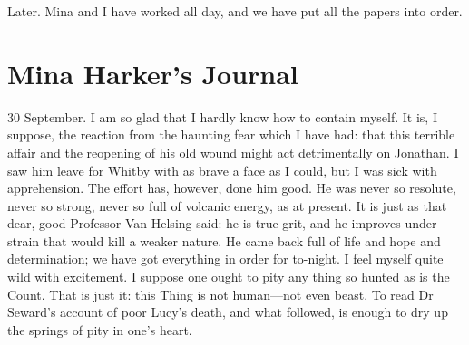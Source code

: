 \begin{diary}{Later.}
Mina and I have worked all day, and we have put all the papers into order.
\end{diary}

\section{Mina Harker's Journal}

\begin{diary}{30 September.}
I am so glad that I hardly know how to contain myself. It is, I suppose, the reaction from the haunting fear which I have had: that this terrible affair and the reopening of his old wound might act detrimentally on Jonathan. I saw him leave for Whitby with as brave a face as I could, but I was sick with apprehension. The effort has, however, done him good. He was never so resolute, never so strong, never so full of volcanic energy, as at present. It is just as that dear, good Professor Van Helsing said: he is true grit, and he improves under strain that would kill a weaker nature. He came back full of life and hope and determination; we have got everything in order for to-night. I feel myself quite wild with excitement. I suppose one ought to pity any thing so hunted as is the Count. That is just it: this Thing is not human—not even beast. To read Dr Seward's account of poor Lucy's death, and what followed, is enough to dry up the springs of pity in one's heart.
\end{diary}
 

